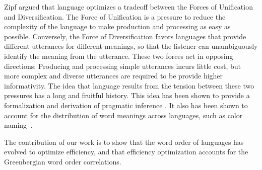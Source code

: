 \documentclass[9pt,twocolumn,twoside,lineno]{pnas-new}
\newcommand{\key}[1]{\textbf{#1}}
\begin{document}
Zipf \cite{zipf1949human} argued that language optimizes a tradeoff between the Forces of Unification and Diversification.
The Force of Unification is a pressure to reduce the complexity of the language to make production and processing as easy as possible.
Conversely, the Force of Diversification favors languages that provide different utterances for different meanings, so that the listener can unambiguously identify the meaning from the utterance.
These two forces act in opposing directions:
Producing and processing simple utterances incurs little cost, but more complex and diverse utterances are required to be provide higher informativity.
The idea that language results from the tension between these two pressures has a long and fruitful history.
%
%
%
This idea has been shown to provide a formalization and derivation of pragmatic inference \cite{horn-toward-1984, frank2012predicting}.
It also has been shown to account for the distribution of word meanings across languages, such as color naming~\cite{zaslavsky2018efficient}.




%

%
%




The contribution of our work is to show  that the word order of languages has evolved to optimize efficiency, and that efficiency optimization accounts for the Greenbergian word order correlations.
\end{document}
